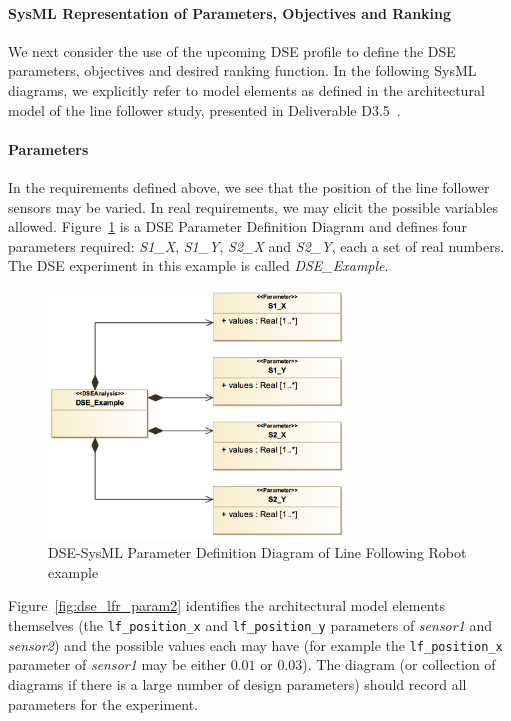 \paragraph{SysML Representation of Parameters, Objectives and Ranking}

We next consider the use of the upcoming DSE profile to define the DSE parameters, objectives and desired ranking function. In the following SysML diagrams, we explicitly refer to model elements as defined in the architectural model of the line follower study, presented in Deliverable D3.5~\cite{INTOCPSD3.5}.

\paragraph{Parameters}   In the requirements defined above, we see that the position of the line follower sensors may be varied. In real requirements, we may elicit the possible variables allowed. Figure~\ref{fig:dse_lfr_param} is a DSE Parameter Definition Diagram and defines four parameters required: \emph{S1\_X}, \emph{S1\_Y}, \emph{S2\_X} and \emph{S2\_Y}, each a set of real numbers.  The DSE experiment in this example is called \emph{DSE\_Example}.

\begin{figure}[htbp]
	\centering
	\includegraphics[width=0.7\textwidth]{figures/LFR_DSE_Param}
\caption{DSE-SysML Parameter Definition Diagram of Line Following Robot example}
\label{fig:dse_lfr_param}
\end{figure}

Figure~\ref{fig:dse_lfr_param2} identifies the architectural model elements themselves (the \texttt{lf\_position\_x} and  \texttt{lf\_position\_y} parameters of \emph{sensor1} and  \emph{sensor2}) and the possible values each may have (for example the \texttt{lf\_position\_x} parameter of \emph{sensor1} may be either $0.01$ or $0.03$). The diagram (or collection of diagrams if there is a large number of design parameters) should record all parameters for the experiment.

